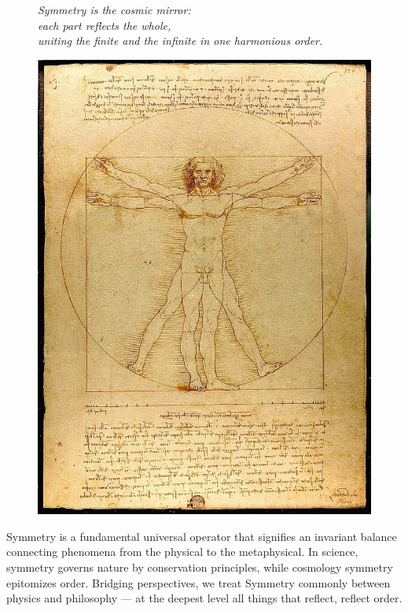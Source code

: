\documentclass[11pt]{article}
\begin{document}
\begin{figure}[ht]
    \centering
    \begin{minipage}[c]{0.6\textwidth}
        \Large\raggedright
        \textit{Symmetry is the cosmic mirror:\\
        each part reflects the whole,\\ 
        uniting the finite and the infinite in one harmonious order.}\\[1em]
    \end{minipage}    
    \hfill
    \begin{minipage}[c]{0.3\textwidth}
        \includegraphics[width=\linewidth]{assets/Da_Vinci_Vitruve_Luc_Viatour.jpg} 
    \end{minipage}
\end{figure}
Symmetry is a fundamental universal operator that signifies an invariant balance connecting phenomena from the physical to the metaphysical. In science, symmetry governs nature by conservation principles, while cosmology symmetry epitomizes order. Bridging perspectives, we treat Symmetry commonly between physics and philosophy --- at the deepest level all things that reflect, reflect order.
\end{document}
